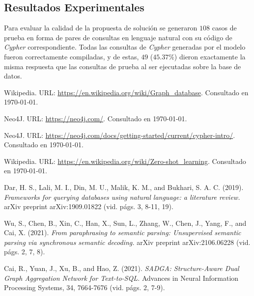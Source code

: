 \documentclass[a4paper,10pt,twocolumn]{article}
\begin{document}
\subsection{Resultados Experimentales}
Para evaluar la calidad de la propuesta de solución se generaron $108$ casos de prueba en forma de pares de consultas en lenguaje natural con su código de \textit{Cypher} correspondiente. Todas las consultas de \textit{Cypher} generadas por el modelo fueron correctamente compiladas, y  de estas, $49$ ($45.37\%$) dieron exactamente la misma respuesta que las consultas de prueba al ser ejecutadas sobre la base de datos.

\begin{thebibliography}{99}
	
	 Wikipedia. URL: \href{https://en.wikipedia.org/wiki/Graph_database}
	  {https://en.wikipedia.org/wiki/Graph\_database}.
		Consultado en \today.

	 Neo4J. URL: \href{https://neo4j.com/}
	  {https://neo4j.com/}.
		Consultado en \today.

	 Neo4J. URL: \href{https://neo4j.com/docs/getting-started/current/cypher-intro/}
	  {https://neo4j.com/docs/getting-started/current/cypher-intro/}.
		Consultado en \today.

	 Wikipedia. URL: \href{https://en.wikipedia.org/wiki/Zero-shot_learning}
	  {https://en.wikipedia.org/wiki/Zero-shot\_learning}.
		Consultado en \today.

	 Dar, H. S., Lali, M. I., Din, M. U., Malik, K. M., and Bukhari, S. A. C. (2019). \emph{Frameworks for querying databases using natural language: a literature review.}
		arXiv preprint arXiv:1909.01822 (vid. págs. 3, 8-11, 19).

	 Wu, S., Chen, B., Xin, C., Han, X., Sun, L., Zhang, W., Chen, J., Yang, F., and Cai, X. (2021). \emph{From paraphrasing to semantic parsing: Unsupervised semantic parsing via synchronous semantic decoding.}
		arXiv preprint arXiv:2106.06228 (vid. págs. 2, 7, 8).

	 Cai, R., Yuan, J., Xu, B., and Hao, Z. (2021). \emph{SADGA: Structure-Aware Dual Graph
	Aggregation Network for Text-to-SQL.}
		Advances in Neural Information Processing Systems, 34, 7664-7676 (vid. págs. 2, 7-9).


\end{thebibliography}
\end{document}
